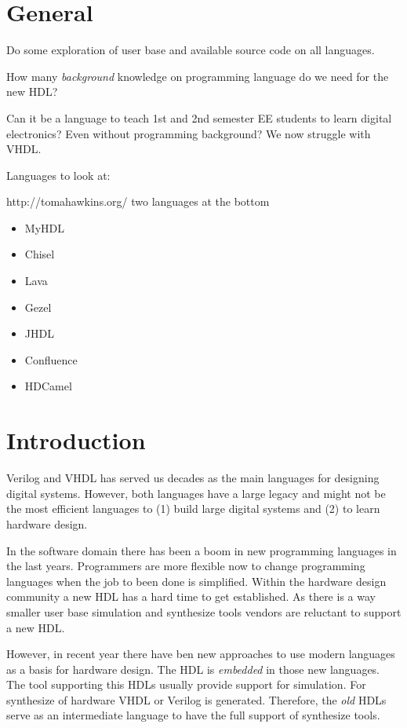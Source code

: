 \documentclass[10pt, technote, draftcls, onecolumn]{IEEEtran}
\begin{document}
\section{General}

Do some exploration of user base and available source code on all languages.

How many \emph{background} knowledge on programming language do we need for the new HDL?

Can it be a language to teach 1st and 2nd semester EE students to learn digital
electronics? Even without programming background? We now struggle with VHDL.

Languages to look at:

http://tomahawkins.org/ two languages at the bottom

\begin{itemize}
   \item MyHDL
   \item Chisel
   \item Lava
   \item Gezel
   \item JHDL
   \item Confluence
   \item HDCamel
\end{itemize}

\section{Introduction}

Verilog and VHDL has served us decades as the main languages for designing
digital systems. However, both languages have a large legacy and might not be
the most efficient languages to (1) build large digital systems and (2) to learn
hardware design.

In the software domain there has been a boom in new programming languages
in the last years. Programmers are more flexible now to change programming
languages when the job to been done is simplified. Within the hardware design
community a new HDL has a hard time to get established. As there is a way
smaller user base simulation and synthesize tools vendors are reluctant to
support a new HDL.

However, in recent year there have ben new approaches to use modern
languages as a basis for hardware design. The HDL is \emph{embedded}
in those new languages. The tool supporting this HDLs usually provide
support for simulation. For synthesize of hardware VHDL or Verilog is
generated. Therefore, the \emph{old} HDLs serve as an intermediate
language to have the full support of synthesize tools.
\end{document}
